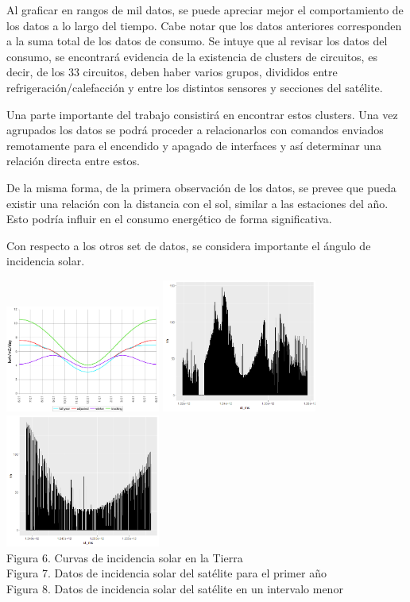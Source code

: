 \documentclass[../Main.tex]{subfiles}
\begin{document}
Al graficar en rangos de mil datos, se puede apreciar mejor el comportamiento de los datos a lo largo del tiempo. Cabe notar que los datos anteriores corresponden a la suma total de los datos de consumo. Se intuye que al revisar los datos del consumo, se encontrará evidencia de la existencia de clusters de circuitos, es decir, de los 33 circuitos, deben haber varios grupos, divididos entre refrigeración/calefacción y entre los distintos sensores y secciones del satélite.
\newline \par 
Una parte importante del trabajo consistirá en encontrar estos clusters. Una vez agrupados los datos se podrá proceder a relacionarlos con comandos enviados remotamente para el encendido y apagado de interfaces y así determinar una relación directa entre estos. 
\newline \par 
De la misma forma, de la primera observación de los datos, se prevee que pueda existir una relación con la distancia con el sol, similar a las estaciones del año. Esto podría influir en el consumo energético de forma significativa.
\newline \par 
Con respecto a los otros set de datos, se considera importante el ángulo de incidencia solar.
\begin{center}
\includegraphics[width=2in]{Assets/optsolargraph.jpg}
\includegraphics[width=2in]{Assets/saaf1saAll.png}
\includegraphics[width=2in]{Assets/saaf1500k850k.png}
\\Figura 6. Curvas de incidencia solar en la Tierra
\\Figura 7. Datos de incidencia solar del satélite para el primer año
\\Figura 8. Datos de incidencia solar del satélite en un intervalo menor
\end{center}
\end{document}
